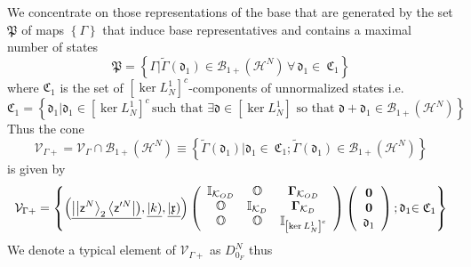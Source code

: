 \documentclass[aps,preprint]{revtex4}%
\begin{document}
We concentrate on those representations of the base that are generated by the
set $\mathfrak{P}$ of maps $\left\{  \Gamma\right\}  $ that induce base
representatives and contains a maximal number of states
\begin{equation}
\mathfrak{P}=\left\{  \Gamma|\tilde{\Gamma}\left(  \mathfrak{d}_{1}\right)
\in\mathcal{B}_{1+}\left(  \mathcal{H}^{N}\right)  \,\forall\,\mathfrak{d}%
_{1}\in\ \mathfrak{C}_{1}\right\}
\end{equation}
where $\mathfrak{C}_{1}$ is the set of $\left[  \ker L_{N}^{1}\right]  ^{c}%
$-components of unnormalized states i.e.
\begin{equation}
\mathfrak{C}_{1}=\left\{  \mathfrak{d}_{1}|\mathfrak{d}_{1}\in\left[  \ker
L_{N}^{1}\right]  ^{c}\,\text{such that }\exists\mathfrak{d\in}\left[  \ker
L_{N}^{1}\right]  \text{ so that }\mathfrak{d+d}_{1}\in\mathcal{B}_{1+}\left(
\mathcal{H}^{N}\right)  \right\}
\end{equation}
Thus the cone
\begin{equation}
\mathcal{V}_{\Gamma+}=\mathcal{V}_{\Gamma}\cap\mathcal{B}_{1+}\left(
\mathcal{H}^{N}\right)  \equiv\left\{  \tilde{\Gamma}\left(  \mathfrak{d}%
_{1}\right)  |\mathfrak{d}_{1}\in\ \mathfrak{C}_{1};\tilde{\Gamma}\left(
\mathfrak{d}_{1}\right)  \in\mathcal{B}_{1+}\left(  \mathcal{H}^{N}\right)
\right\}
\end{equation}
is given by
\begin{equation}
\mathcal{V}_{\Gamma+}=\left\{  \left(  \underline{\left\vert \left\vert
\mathsf{z}^{N}\right\rangle _{2}\left\langle \mathsf{z}^{\prime N}\right\vert
\right)  },\underline{\left\vert k\right)  },\underline{\left\vert
\mathfrak{x}\right)  }\right)  \left(
\begin{array}
[c]{ccc}%
\mathbb{I}_{\mathcal{K}_{OD}} & \mathbb{O} & \mathbf{\Gamma}_{\mathcal{K}%
_{OD}}\\
\mathbb{O} & \mathbb{I}_{\mathcal{K}_{D}} & \mathbf{\Gamma}_{\mathcal{K}_{D}%
}\\
\mathbb{O} & \mathbb{O} & \mathbb{I}_{\left[  \ker L_{N}^{1}\right]  ^{c}}%
\end{array}
\right)  \left(
\begin{array}
[c]{c}%
\mathbf{0}\\
\mathbf{0}\\
\mathfrak{d}_{1}%
\end{array}
\right)  ;\mathfrak{d}_{1}\mathfrak{\in C}_{1}\right\}
\end{equation}
We denote a typical element of $\mathcal{V}_{\Gamma+}$ as $D_{0_{F}}^{N}$ thus
\end{document}
